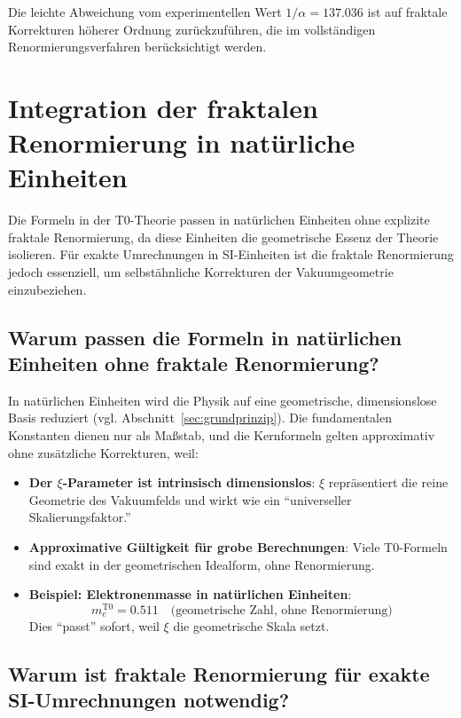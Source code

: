\documentclass[12pt,a4paper]{article}
\begin{document}
	Die leichte Abweichung vom experimentellen Wert $1/\alpha = 137.036$ ist auf fraktale Korrekturen höherer Ordnung zurückzuführen, die im vollständigen Renormierungsverfahren berücksichtigt werden.
	
	\section{Integration der fraktalen Renormierung in natürliche Einheiten}
	
	Die Formeln in der T0-Theorie passen in natürlichen Einheiten ohne explizite fraktale Renormierung, da diese Einheiten die geometrische Essenz der Theorie isolieren. Für exakte Umrechnungen in SI-Einheiten ist die fraktale Renormierung jedoch essenziell, um selbstähnliche Korrekturen der Vakuumgeometrie einzubeziehen.
	
	\subsection{Warum passen die Formeln in natürlichen Einheiten ohne fraktale Renormierung?}
	
	In natürlichen Einheiten wird die Physik auf eine geometrische, dimensionslose Basis reduziert (vgl. Abschnitt~\ref{sec:grundprinzip}). Die fundamentalen Konstanten dienen nur als Maßstab, und die Kernformeln gelten approximativ ohne zusätzliche Korrekturen, weil:
	
	\begin{itemize}
		\item \textbf{Der $\xi$-Parameter ist intrinsisch dimensionslos}: $\xi$ repräsentiert die reine Geometrie des Vakuumfelds und wirkt wie ein ``universeller Skalierungsfaktor.''
		
		\item \textbf{Approximative Gültigkeit für grobe Berechnungen}: Viele T0-Formeln sind exakt in der geometrischen Idealform, ohne Renormierung.
		
		\item \textbf{Beispiel: Elektronenmasse in natürlichen Einheiten}:
		\begin{equation}
			m_e^{\mathrm{T0}} = 0.511 \quad \text{(geometrische Zahl, ohne Renormierung)}
		\end{equation}
		Dies ``passt'' sofort, weil $\xi$ die geometrische Skala setzt.
	\end{itemize}
	
	\subsection{Warum ist fraktale Renormierung für exakte SI-Umrechnungen notwendig?}
	
\end{document}
